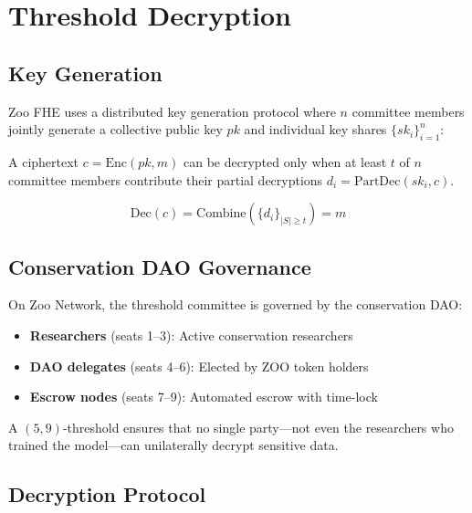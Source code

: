 \section{Threshold Decryption}

\label{sec:threshold}

\subsection{Key Generation}

Zoo FHE uses a distributed key generation protocol where $n$ committee members jointly generate a collective public key $pk$ and individual key shares $\{sk_i\}_{i=1}^n$:

\begin{definition}
A ciphertext $c = \text{Enc}(pk, m)$ can be decrypted only when at least $t$ of $n$ committee members contribute their partial decryptions $d_i = \text{PartDec}(sk_i, c)$.
\end{definition}

\begin{equation}
\text{Dec}(c) = \text{Combine}(\{d_i\}_{|S| \geq t}) = m
\end{equation}

\subsection{Conservation DAO Governance}

On Zoo Network, the threshold committee is governed by the conservation DAO:

\begin{itemize}
    \item \textbf{Researchers} (seats 1--3): Active conservation researchers
    \item \textbf{DAO delegates} (seats 4--6): Elected by ZOO token holders
    \item \textbf{Escrow nodes} (seats 7--9): Automated escrow with time-lock
\end{itemize}

A $(5, 9)$-threshold ensures that no single party---not even the researchers who trained the model---can unilaterally decrypt sensitive data.

\subsection{Decryption Protocol}


